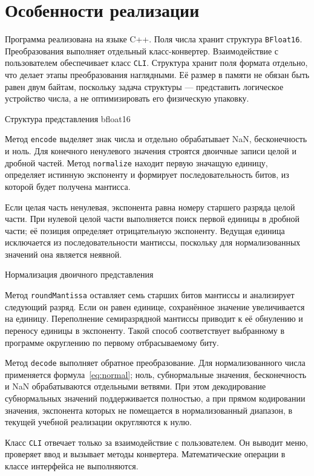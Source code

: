 \section{Особенности реализации}

Программа реализована на языке C++. Поля числа хранит структура
\texttt{BFloat16}. Преобразования выполняет отдельный класс-конвертер.
Взаимодействие с пользователем обеспечивает класс \texttt{CLI}.
Структура хранит поля формата отдельно, что делает этапы преобразования
наглядными. Её размер в
памяти не обязан быть равен двум байтам, поскольку задача структуры ---
представить логическое устройство числа, а не оптимизировать его физическую
упаковку.

    {Структура представления bfloat16}
    {\label{lst:structure}}

Метод \texttt{encode} выделяет знак числа и отдельно обрабатывает NaN,
бесконечность и ноль. Для конечного ненулевого значения строятся двоичные записи
целой и дробной частей. Метод \texttt{normalize} находит первую значащую единицу,
определяет истинную экспоненту и формирует последовательность битов, из которой
будет получена мантисса.

Если целая часть ненулевая, экспонента равна номеру старшего разряда целой части.
При нулевой целой части выполняется поиск первой единицы в дробной части; её
позиция определяет отрицательную экспоненту. Ведущая единица исключается из
последовательности мантиссы, поскольку для нормализованных значений она является
неявной.

    {Нормализация двоичного представления}
    {\label{lst:normalize}}

Метод \texttt{roundMantissa} оставляет семь старших битов мантиссы и анализирует
следующий разряд. Если он равен единице, сохранённое значение увеличивается на
единицу. Переполнение семиразрядной мантиссы приводит к её обнулению и переносу
единицы в экспоненту. Такой способ соответствует выбранному в программе
округлению по первому отбрасываемому биту.

Метод \texttt{decode} выполняет обратное преобразование. Для нормализованного
числа применяется формула~\eqref{eq:normal}; ноль, субнормальные значения,
бесконечность и NaN обрабатываются отдельными ветвями. При этом декодирование
субнормальных значений поддерживается полностью, а при прямом кодировании
значения, экспонента которых не помещается в нормализованный диапазон, в текущей
учебной реализации округляются к нулю.

Класс \texttt{CLI} отвечает только за взаимодействие с пользователем. Он выводит
меню, проверяет ввод и вызывает методы конвертера. Математические операции в
классе интерфейса не выполняются.

